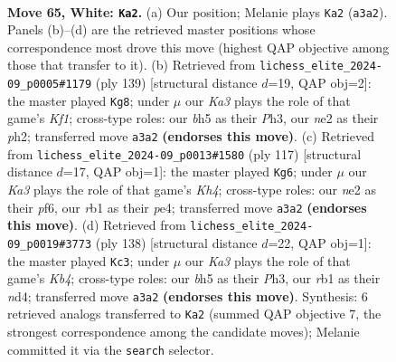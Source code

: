 \documentclass[11pt]{article}
\begin{document}
\clearpage

\begin{figure}[p]\centering
\begin{subfigure}{0.46\textwidth}\centering
\resizebox{\linewidth}{!}{%
\newchessgame
\chessboard[
  setfen={8/7p/5k2/4p2b/8/K7/4n1r1/1r6 w - - 3 65},
  showmover=false,
  pgfstyle=straightmove, color=movearrow, markmove={a3-a2}
]}
\caption{}
\end{subfigure}\hfill
\begin{subfigure}{0.46\textwidth}\centering
\resizebox{\linewidth}{!}{%
\newchessgame
\chessboard[
  setfen={5k2/2R5/1R6/3KP3/8/7p/7P/8 b - - 0 70},
  showmover=false,
  pgfstyle=straightmove, color=movearrow, markmove={f8-g8}
]}
\caption{}
\end{subfigure}
\\[4pt]
\begin{subfigure}{0.46\textwidth}\centering
\resizebox{\linewidth}{!}{%
\newchessgame
\chessboard[
  setfen={8/8/4RP2/7k/4P3/7N/7K/8 b - - 0 59},
  showmover=false,
  pgfstyle=straightmove, color=movearrow, markmove={h5-g6}
]}
\caption{}
\end{subfigure}\hfill
\begin{subfigure}{0.46\textwidth}\centering
\resizebox{\linewidth}{!}{%
\newchessgame
\chessboard[
  setfen={8/8/8/4k3/1K1n1p1p/7P/8/8 w - - 0 70},
  showmover=false,
  pgfstyle=straightmove, color=movearrow, markmove={b4-c3}
]}
\caption{}
\end{subfigure}
\caption{\textbf{Move 65, White: \texttt{Ka2}.} (a) Our position; Melanie plays \texttt{Ka2} (\texttt{a3a2}). Panels (b)--(d) are the retrieved master positions whose correspondence most drove this move (highest QAP objective among those that transfer to it). (b) Retrieved from \texttt{lichess\_elite\_2024-09\_p0005\#1179} (ply 139) [structural distance $d$=19, QAP obj=2]: the master played \texttt{Kg8}; under $\mu$ our \emph{Ka3} plays the role of that game's \emph{Kf1}; cross-type roles: our \emph{b}h5 as their \emph{P}h3, our \emph{n}e2 as their \emph{p}h2; transferred move \texttt{a3a2} \textbf{(endorses this move)}. (c) Retrieved from \texttt{lichess\_elite\_2024-09\_p0013\#1580} (ply 117) [structural distance $d$=17, QAP obj=1]: the master played \texttt{Kg6}; under $\mu$ our \emph{Ka3} plays the role of that game's \emph{Kh4}; cross-type roles: our \emph{n}e2 as their \emph{p}f6, our \emph{r}b1 as their \emph{p}e4; transferred move \texttt{a3a2} \textbf{(endorses this move)}. (d) Retrieved from \texttt{lichess\_elite\_2024-09\_p0019\#3773} (ply 138) [structural distance $d$=22, QAP obj=1]: the master played \texttt{Kc3}; under $\mu$ our \emph{Ka3} plays the role of that game's \emph{Kb4}; cross-type roles: our \emph{b}h5 as their \emph{P}h3, our \emph{r}b1 as their \emph{n}d4; transferred move \texttt{a3a2} \textbf{(endorses this move)}. Synthesis: 6 retrieved analogs transferred to \texttt{Ka2} (summed QAP objective 7, the strongest correspondence among the candidate moves); Melanie committed it via the \texttt{search} selector.}
\label{fig:thought-m128}
\end{figure}
\end{document}
